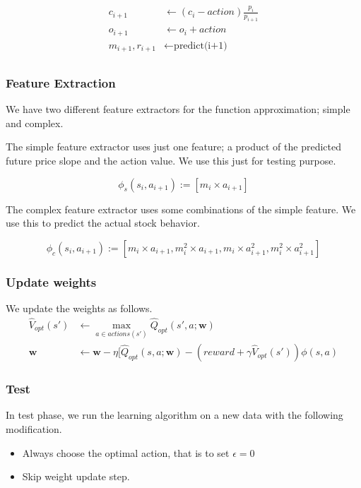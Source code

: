 \documentclass[twocolumn,10pt]{asme2ej}
\newcommand{\vect}[1]{\boldsymbol{#1}}
\begin{document}
\begin{align*}
  c_{i+1} &\gets (c_{i} - action)\frac{p_i}{p_{i+1}} \\
  o_{i+1} &\gets o_{i} + action \\
  m_{i+1}, r_{i+1} &\gets \text{predict(i+1)} \\
\end{align*}

\subsubsection*{Feature Extraction}

We have two different feature extractors for the function approximation; simple
and complex.

The simple feature extractor uses just one feature; a product of the predicted
future price slope and the action value. We use this just for testing purpose.

\[
\phi_s(s_i,a_{i+1}) := [m_i \times a_{i+1}]
\]

The complex feature extractor uses some combinations of the simple feature. We
use this to predict the actual stock behavior.

\[
\phi_c(s_i,a_{i+1}) := [m_i \times a_{i+1}, m_i^2 \times a_{i+1}, m_i \times a_{i+1}^2, m_i^2 \times a_{i+1}^2 ]
\]

\subsubsection*{Update weights}

We update the weights as follows.
\begin{align*}
\hat{V}_{opt}(s') &\gets \max_{a \in actions(s')}\hat{Q}_{opt}(s', a;\vect{w}) \\
\vect{w} &\gets \vect{w} - \eta[\hat{Q}_{opt}(s, a;\vect{w}) - (reward + \gamma \hat{V}_{opt}(s'))\phi(s,a)
\end{align*}

\subsubsection{Test}

In test phase, we run the learning algorithm on a new data with the
following modification.

\begin{itemize}
\item Always choose the optimal action, that is to set $\epsilon = 0$
\item Skip weight update step.
\end{itemize}
\end{document}

